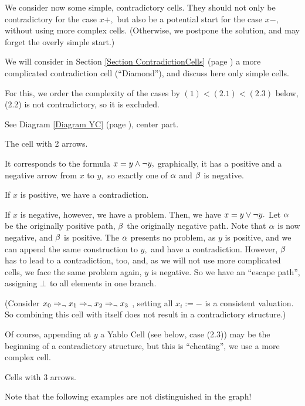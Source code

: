 \label{Example Simple-Cells}


We consider now some simple, contradictory cells. They should not only
be contradictory for the case $x+,$ but also be a potential start for
the case $x-,$ without using more complex cells. (Otherwise, we
postpone the solution, and may forget the overly simple start.)

We will consider in
Section 
\ref{Section ContradictionCells} (page 
\pageref{Section ContradictionCells})
a more complicated contradiction cell (``Diamond''), and discuss here
only simple cells.

For this, we order the complexity of the cases by $(1)<(2.1)<(2.3)$ below,
(2.2) is not contradictory, so it is excluded.

See Diagram \ref{Diagram YC} (page \pageref{Diagram YC}), center part.

 \xEh
 \xDH The cell with 2 arrows.

It corresponds to the formula
$x=y \wedge \neg y,$ graphically, it has a positive and a negative arrow
from
$x$ to $y,$ so exactly one of $ \alpha $ and $ \beta $ is negative.

If $x$ is positive, we have a contradiction.

If $x$ is negative, however, we have a problem. Then, we have
$x=y \vee \neg y.$ Let $ \alpha $ be the originally positive path, $ \beta $
the
originally negative path. Note that $ \alpha $ is now negative, and $ \beta $
is positive.
The $ \alpha $ presents no problem, as $y$ is positive,
and we can append the same construction to $y,$ and have a contradiction.
However, $ \beta $ has to lead to a contradiction, too, and, as we will not
use more complicated cells, we face the same problem again, $y$ is
negative. So we have an ``escape path'', assigning $ \bot $ to all elements
in one
branch.

(Consider
$x_{0} \Rightarrow_{ \neg }x_{1} \Rightarrow_{ \neg }x_{2} \Rightarrow_{ \neg }x_{3}$  \Xl,
setting all $x_{i}:=-$ is a consistent valuation.
So combining this cell with itself does not result in a contradictory
structure.)

Of course, appending at $y$ a Yablo Cell (see below, case (2.3))
may be the beginning of a contradictory structure, but this is
``cheating'', we use a more complex cell.

 \xDH Cells with 3 arrows.

Note that the following examples are not distinguished in the graph!

